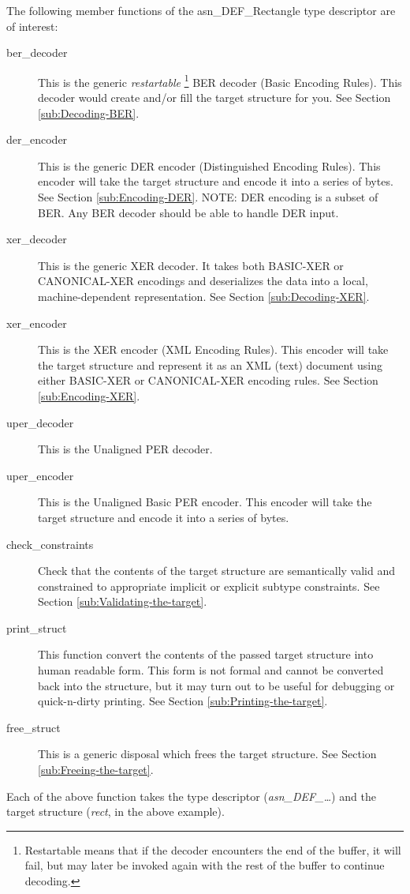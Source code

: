 \documentclass[english,oneside,12pt]{book}
\begin{document}
The following member functions of the asn\_DEF\_Rectangle type descriptor
are of interest:
\begin{description}
\item [{ber\_decoder}] This is the generic \emph{restartable}%
\footnote{Restartable means that if the decoder encounters the end of the buffer,
it will fail, but may later be invoked again with the rest of the
buffer to continue decoding.%
} BER decoder (Basic Encoding Rules). This decoder would create and/or
fill the target structure for you. See Section \vref{sub:Decoding-BER}.
\item [{der\_encoder}] This is the generic DER encoder (Distinguished Encoding
Rules). This encoder will take the target structure and encode it
into a series of bytes. See Section \vref{sub:Encoding-DER}. NOTE:
DER encoding is a subset of BER. Any BER decoder should be able to
handle DER input.
\item [{xer\_decoder}] This is the generic XER decoder. It takes both BASIC-XER
or CANONICAL-XER encodings and deserializes the data into a local,
machine-dependent representation. See Section \vref{sub:Decoding-XER}.
\item [{xer\_encoder}] This is the XER encoder (XML Encoding Rules). This
encoder will take the target structure and represent it as an XML
(text) document using either BASIC-XER or CANONICAL-XER encoding rules.
See Section \vref{sub:Encoding-XER}.
\item [{uper\_decoder}] This is the Unaligned PER decoder.
\item [{uper\_encoder}] This is the Unaligned Basic PER encoder. This encoder
will take the target structure and encode it into a series of bytes.
\item [{check\_constraints}] Check that the contents of the target structure
are semantically valid and constrained to appropriate implicit or
explicit subtype constraints. See Section \vref{sub:Validating-the-target}.
\item [{print\_struct}] This function convert the contents of the passed
target structure into human readable form. This form is not formal
and cannot be converted back into the structure, but it may turn out
to be useful for debugging or quick-n-dirty printing. See Section
\vref{sub:Printing-the-target}.
\item [{free\_struct}] This is a generic disposal which frees the target
structure. See Section \vref{sub:Freeing-the-target}.
\end{description}
Each of the above function takes the type descriptor (\emph{asn\_DEF\_\ldots{}})
and the target structure (\emph{rect}, in the above example).
\end{document}
